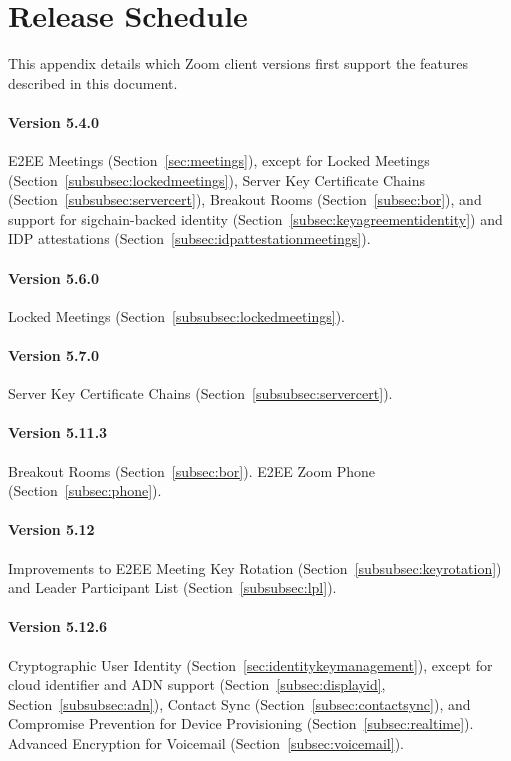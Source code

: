 \section{Release Schedule}
\label{appendix:releases}
This appendix details which Zoom client versions first support the features described in this
document.

\paragraph{Version 5.4.0}
E2EE Meetings (Section~\ref{sec:meetings}), except for Locked Meetings
(Section~\ref{subsubsec:lockedmeetings}), Server Key Certificate Chains
(Section~\ref{subsubsec:servercert}), Breakout Rooms (Section~\ref{subsec:bor}), and support for
sigchain-backed identity (Section~\ref{subsec:keyagreementidentity}) and IDP attestations
(Section~\ref{subsec:idpattestationmeetings}).

\paragraph{Version 5.6.0}
Locked Meetings (Section~\ref{subsubsec:lockedmeetings}).

\paragraph{Version 5.7.0}
Server Key Certificate Chains (Section~\ref{subsubsec:servercert}).

\paragraph{Version 5.11.3}
Breakout Rooms (Section~\ref{subsec:bor}). E2EE Zoom Phone (Section~\ref{subsec:phone}).

\paragraph{Version 5.12}
Improvements to E2EE Meeting Key Rotation (Section~\ref{subsubsec:keyrotation}) and Leader
Participant List (Section~\ref{subsubsec:lpl}).

\paragraph{Version 5.12.6}
Cryptographic User Identity (Section~\ref{sec:identitykeymanagement}), except for cloud identifier
and ADN support (Section~\ref{subsec:displayid}, Section~\ref{subsubsec:adn}), Contact Sync
(Section~\ref{subsec:contactsync}), and Compromise Prevention for Device Provisioning
(Section~\ref{subsec:realtime}). Advanced Encryption for Voicemail (Section~\ref{subsec:voicemail}).


